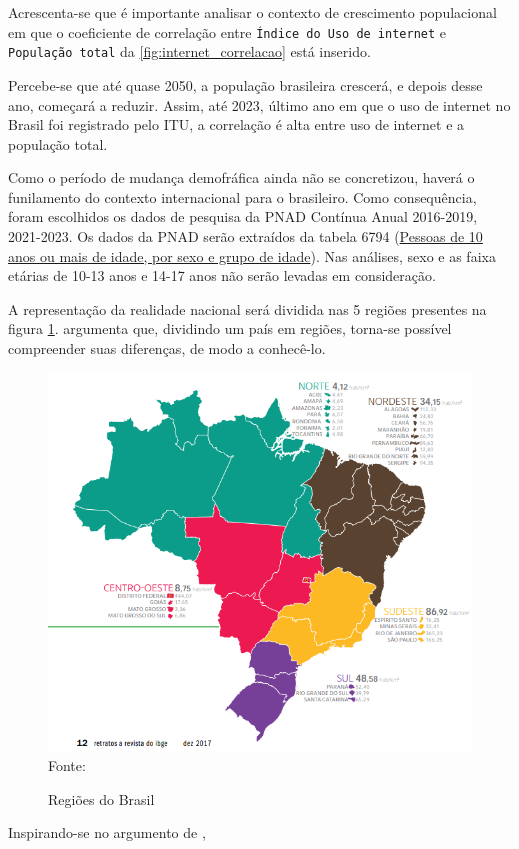 \newpage
Acrescenta-se que é importante analisar o contexto de crescimento populacional em que o coeficiente de correlação entre \texttt{Índice do Uso de internet} e \texttt{População total} da \ref{fig:internet_correlacao} está inserido. 

Percebe-se que até quase 2050, a população brasileira crescerá, e depois desse ano, começará a reduzir. Assim, até 2023, último ano em que o uso de internet no Brasil foi registrado pelo ITU, a correlação é alta entre uso de internet e a população total.

Como o período de mudança demofráfica ainda não se concretizou, haverá o funilamento do contexto internacional para o brasileiro. Como consequência, foram escolhidos os dados de pesquisa da PNAD Contínua Anual 2016-2019, 2021-2023. Os dados da PNAD serão extraídos da tabela 6794 (\href{https://sidra.ibge.gov.br/tabela/6794}{Pessoas de 10 anos ou mais de idade, por sexo e grupo de idade}). Nas análises, sexo e as faixa etárias de 10-13 anos e 14-17 anos não serão levadas em consideração.

A representação da realidade nacional será dividida nas 5 regiões presentes na figura \ref{fig:regioes_brasil}. \cite{HAMAM_2017} argumenta que, dividindo um país em regiões, torna-se possível compreender suas diferenças, de modo a conhecê-lo.

\begin{figure}[ht]
    \centering
    \caption{Regiões do Brasil}
    \includegraphics[width=1\linewidth]{figuras/regioes/regioes_brasil.PNG}
    \label{fig:regioes_brasil}
    \footnotesize{Fonte: \cite{HAMAM_2017}}
\end{figure}

Inspirando-se no argumento de \cite{HAMAM_2017},